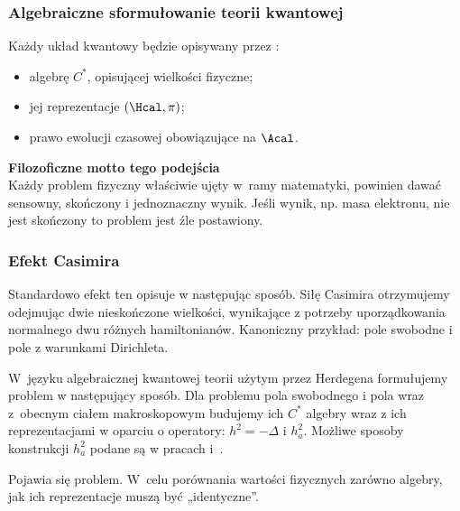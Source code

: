 \documentclass[10pt,t]{beamer}
\begin{document}
\begin{frame}
  \frametitle{Algebraiczne sformułowanie teorii kwantowej}


  Każdy układ kwantowy będzie opisywany przez
  \cite{HaagLocalQuantumPhysics1996}:
  \begin{itemize}

  \item algebrę $C^{ * }$, opisującej wielkości fizyczne;

  \item jej reprezentacje $( \Hcal, \pi )$;

  \item prawo ewolucji czasowej obowiązujące na $\Acal$.

  \end{itemize}


  \textbf{Filozoficzne motto tego podejścia} \\
  Każdy problem fizyczny właściwie ujęty w~ramy matematyki, powinien dawać
  sensowny, skończony i jednoznaczny wynik. Jeśli wynik, np. masa elektronu,
  nie jest skończony to problem jest źle postawiony.

\end{frame}





\begin{frame}
  \frametitle{Efekt Casimira}


  Standardowo efekt ten opisuje w następując sposób.
  Siłę Casimira otrzymujemy odejmując dwie nieskończone wielkości,
  wynikające z potrzeby uporządkowania normalnego dwu różnych
  hamiltonianów. Kanoniczny przykład: pole swobodne i pole z warunkami
  Dirichleta.

  W~języku algebraicznej kwantowej teorii użytym przez Herdegena formułujemy
  problem w następujący sposób. Dla problemu pola swobodnego i pola wraz
  z~obecnym ciałem makroskopowym budujemy ich $C^{ * }$ algebry wraz z ich
  reprezentacjami w oparciu o operatory: $h^{ 2 } = - \Delta$ i $h^{ 2 }_{ a }$.
  Możliwe sposoby konstrukcji $h^{ 2 }_{ a }$ podane są w pracach
  \cite{HerdegenQuantumBackreationPartI2005}
  i~\cite{HerdegenStopaGlobalVsLocal2010}.

  Pojawia się problem. W~celu porównania wartości fizycznych zarówno
  algebry, jak ich reprezentacje muszą być „identyczne”.

\end{frame}
\end{document}

